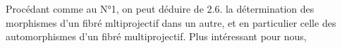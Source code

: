 Procédant comme au N°1, on peut déduire de 2.6. la détermination des
morphismes d'un fibré mltiprojectif dans un autre, et en particulier celle
des automorphismes d'un fibré multiprojectif. Plus intéressant pour nous,

